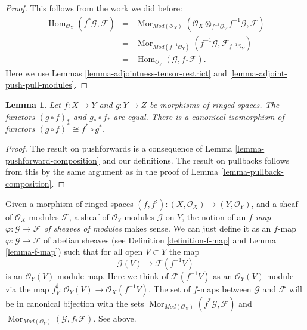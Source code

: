 \documentclass{stacks-project}
\theoremstyle{plain}
\newtheorem{lemma}[subsection]{Lemma}
\theoremstyle{definition}
\theoremstyle{remark}
\numberwithin{equation}{subsection}
\def\Hom{\mathop{\mathrm{Hom}}\nolimits}
\def\Mor{\mathop{\mathrm{Mor}}\nolimits}
\begin{document}
\begin{proof}
This follows from the work we did before:
\begin{eqnarray*}
\Hom_{\mathcal{O}_X}(f^*\mathcal{G}, \mathcal{F})
& = &
\Mor_{\textit{Mod}(\mathcal{O}_X)}(
\mathcal{O}_X \otimes_{f^{-1}\mathcal{O}_Y} f^{-1}\mathcal{G}, \mathcal{F}) \\
& = &
\Mor_{\textit{Mod}(f^{-1}\mathcal{O}_Y)}(
f^{-1}\mathcal{G}, \mathcal{F}_{f^{-1}\mathcal{O}_Y}) \\
& = &
\Hom_{\mathcal{O}_Y}(\mathcal{G}, f_*\mathcal{F}).
\end{eqnarray*}
Here we use Lemmas \ref{lemma-adjointness-tensor-restrict}
and \ref{lemma-adjoint-push-pull-modules}.
\end{proof}

\begin{lemma}
\label{lemma-push-pull-composition-modules}
Let $f : X \to Y$ and $g : Y \to Z$ be morphisms of ringed spaces.
The functors $(g \circ f)_*$ and $g_* \circ f_*$ are equal.
There is a canonical isomorphism of functors
$(g \circ f)^* \cong f^* \circ g^*$.
\end{lemma}

\begin{proof}
The result on pushforwards is a consequence of Lemma
\ref{lemma-pushforward-composition} and our definitions.
The result on pullbacks follows from this by the same
argument as in the proof of Lemma \ref{lemma-pullback-composition}.
\end{proof}


\noindent
Given a morphism of ringed spaces
$(f, f^\sharp) : (X, \mathcal{O}_X) \to (Y, \mathcal{O}_Y)$,
and a sheaf of $\mathcal{O}_X$-modules $\mathcal{F}$,
a sheaf of $\mathcal{O}_Y$-modules $\mathcal{G}$ on $Y$,
the notion of an {\it $f$-map $\varphi : \mathcal{G} \to \mathcal{F}$
of sheaves of modules} makes sense. We can just define
it as an $f$-map $\varphi : \mathcal{G} \to \mathcal{F}$
of abelian sheaves (see Definition \ref{definition-f-map} and
Lemma \ref{lemma-f-map}) such that for all open $V \subset Y$ the map
$$
\mathcal{G}(V) \longrightarrow \mathcal{F}(f^{-1}V)
$$
is an $\mathcal{O}_Y(V)$-module map. Here we think of
$\mathcal{F}(f^{-1}V)$ as an $\mathcal{O}_Y(V)$-module
via the map $f^\sharp_V : \mathcal{O}_Y(V) \to \mathcal{O}_X(f^{-1}V)$.
The set of $f$-maps between
$\mathcal{G}$ and $\mathcal{F}$ will be in canonical bijection
with the sets
$\Mor_{\textit{Mod}(\mathcal{O}_X)}(f^*\mathcal{G}, \mathcal{F})$
and
$\Mor_{\textit{Mod}(\mathcal{O}_Y)}(\mathcal{G}, f_*\mathcal{F})$.
See above.
\end{document}
